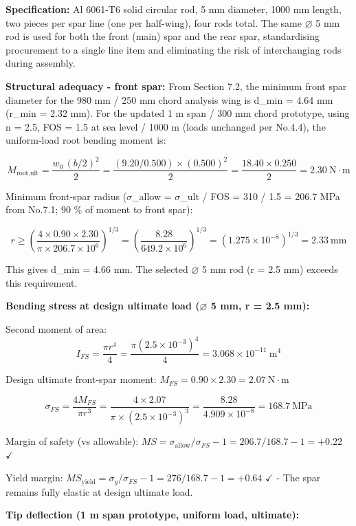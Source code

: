 \documentclass[10pt,a4paper]{article}
\begin{document}
\textbf{Specification:} Al 6061-T6 solid circular rod, 5 mm diameter, 1000 mm length, two pieces per spar line (one per half-wing), four rods total. The same $\varnothing$ 5 mm rod is used for both the front (main) spar and the rear spar, standardising procurement to a single line item and eliminating the risk of interchanging rods during assembly.

\textbf{Structural adequacy - front spar:} From Section 7.2, the minimum front spar diameter for the 980 mm / 250 mm chord analysis wing is d\_min = 4.64 mm (r\_min = 2.32 mm). For the updated 1 m span / 300 mm chord prototype, using n = 2.5, FOS = 1.5 at sea level / 1000 m (loads unchanged per No.4.4), the uniform-load root bending moment is:

\[
M_{\text{root,ult}} = \frac{w_0\,(b/2)^2}{2} = \frac{(9.20/0.500)\times(0.500)^2}{2} = \frac{18.40 \times 0.250}{2} = 2.30\ \text{N}\cdot\text{m}
\]

Minimum front-spar radius (${\sigma}$\_allow = ${\sigma}$\_ult / FOS = 310 / 1.5 = 206.7 MPa from No.7.1; 90 \% of moment to front spar):

\[
r \geq \left(\frac{4 \times 0.90 \times 2.30}{\pi \times 206.7 \times 10^6}\right)^{1/3} = \left(\frac{8.28}{649.2 \times 10^6}\right)^{1/3} = (1.275 \times 10^{-8})^{1/3} = 2.33\ \text{mm}
\]

This gives d\_min = 4.66 mm. The selected $\varnothing$ 5 mm rod (r = 2.5 mm) exceeds this requirement.

\textbf{Bending stress at design ultimate load ($\varnothing$ 5 mm, r = 2.5 mm):}

Second moment of area:
\[
I_{FS} = \frac{\pi r^4}{4} = \frac{\pi (2.5 \times 10^{-3})^4}{4} = 3.068 \times 10^{-11}\ \text{m}^4
\]

Design ultimate front-spar moment: $M_{FS} = 0.90 \times 2.30 = 2.07\ \text{N}\cdot\text{m}$

\[
\sigma_{FS} = \frac{4 M_{FS}}{\pi r^3} = \frac{4 \times 2.07}{\pi \times (2.5 \times 10^{-3})^3} = \frac{8.28}{4.909 \times 10^{-8}} = 168.7\ \text{MPa}
\]

Margin of safety (vs allowable): $MS = \sigma_{\text{allow}}/\sigma_{FS} - 1 = 206.7/168.7 - 1 = +0.22$ $\checkmark $

Yield margin: $MS_{\text{yield}} = \sigma_y/\sigma_{FS} - 1 = 276/168.7 - 1 = +0.64$ $\checkmark $ - The spar remains fully elastic at design ultimate load.

\textbf{Tip deflection (1 m span prototype, uniform load, ultimate):}
\end{document}
